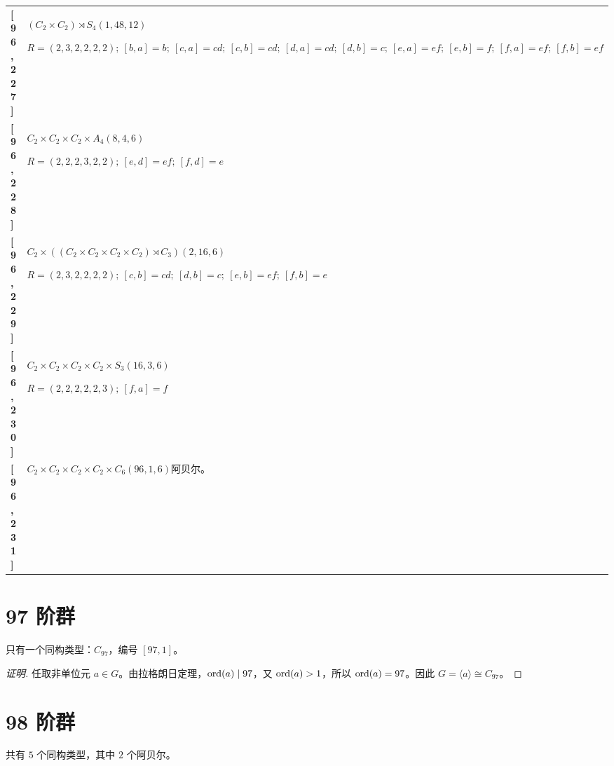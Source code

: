 \documentclass[UTF8,fontset=fandol,11pt,a4paper]{ctexart}
\begin{document}
\begin{longtable}{@{}p{17mm}>{\raggedright\arraybackslash}p{141mm}@{}}
\textbf{[96,227]} & $(C_{2}\times C_{2})\rtimes S_{4}$\quad $(1,48,12)$\par\(R=(2,3,2,2,2,2);\allowbreak\ [b,a]=b;\allowbreak\ [c,a]=cd;\allowbreak\ [c,b]=cd;\allowbreak\ [d,a]=cd;\allowbreak\ [d,b]=c;\allowbreak\ [e,a]=ef;\allowbreak\ [e,b]=f;\allowbreak\ [f,a]=ef;\allowbreak\ [f,b]=ef\)\\[3pt]

\textbf{[96,228]} & $C_{2}\times C_{2}\times C_{2}\times A_{4}$\quad $(8,4,6)$\par\(R=(2,2,2,3,2,2);\allowbreak\ [e,d]=ef;\allowbreak\ [f,d]=e\)\\[3pt]

\textbf{[96,229]} & $C_{2}\times ((C_{2}\times C_{2}\times C_{2}\times C_{2})\rtimes C_{3})$\quad $(2,16,6)$\par\(R=(2,3,2,2,2,2);\allowbreak\ [c,b]=cd;\allowbreak\ [d,b]=c;\allowbreak\ [e,b]=ef;\allowbreak\ [f,b]=e\)\\[3pt]

\textbf{[96,230]} & $C_{2}\times C_{2}\times C_{2}\times C_{2}\times S_{3}$\quad $(16,3,6)$\par\(R=(2,2,2,2,2,3);\allowbreak\ [f,a]=f\)\\[3pt]

\textbf{[96,231]} & $C_{2}\times C_{2}\times C_{2}\times C_{2}\times C_{6}$\quad $(96,1,6)$\quad 阿贝尔。\\[3pt]

\end{longtable}\endgroup

\section*{97 阶群}\label{order:97}

只有一个同构类型：$C_{97}$，编号 $[97,1]$。

\begin{proof}[证明]
任取非单位元 $a\in G$。由拉格朗日定理，$\operatorname{ord}(a)\mid 97$，又 $\operatorname{ord}(a)>1$，所以 $\operatorname{ord}(a)=97$。因此 $G=\langle a\rangle\cong C_{97}$。
\end{proof}

\section*{98 阶群}\label{order:98}

共有 $5$ 个同构类型，其中 $2$ 个阿贝尔。
\end{document}
